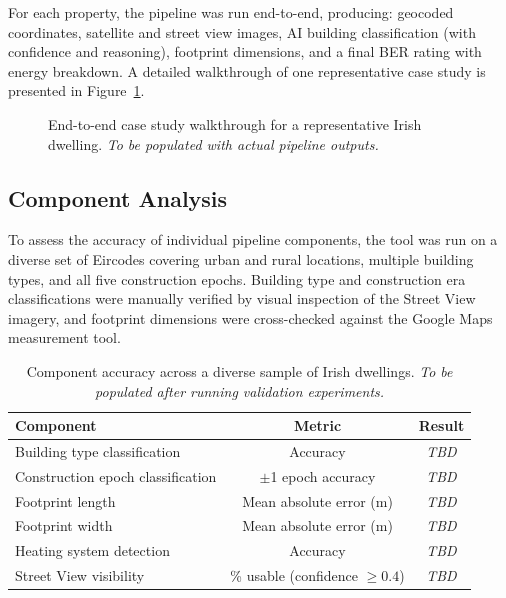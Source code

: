 \documentclass[preprint,12pt,authoryear]{elsarticle}
\begin{document}
For each property, the pipeline was run end-to-end, producing: geocoded coordinates, satellite and street view images, AI building classification (with confidence and reasoning), footprint dimensions, and a final BER rating with energy breakdown. A detailed walkthrough of one representative case study is presented in Figure~\ref{fig:case_study}.

\begin{figure}[htbp]
\centering
{}
\caption{End-to-end case study walkthrough for a representative Irish dwelling. \emph{To be populated with actual pipeline outputs.}}
\label{fig:case_study}
\end{figure}

\subsection{Component Analysis}

To assess the accuracy of individual pipeline components, the tool was run on a diverse set of Eircodes covering urban and rural locations, multiple building types, and all five construction epochs. Building type and construction era classifications were manually verified by visual inspection of the Street View imagery, and footprint dimensions were cross-checked against the Google Maps measurement tool.

\begin{table}[htbp]
\centering
\caption{Component accuracy across a diverse sample of Irish dwellings. \emph{To be populated after running validation experiments.}}
\label{tab:component_accuracy}
\begin{tabular}{@{}lcc@{}}
\toprule
Component & Metric & Result \\
\midrule
Building type classification & Accuracy & \emph{TBD} \\
Construction epoch classification & $\pm$1 epoch accuracy & \emph{TBD} \\
Footprint length & Mean absolute error (m) & \emph{TBD} \\
Footprint width & Mean absolute error (m) & \emph{TBD} \\
Heating system detection & Accuracy & \emph{TBD} \\
Street View visibility & \% usable (confidence $\geq 0.4$) & \emph{TBD} \\
\bottomrule
\end{tabular}
\end{table}
\end{document}
